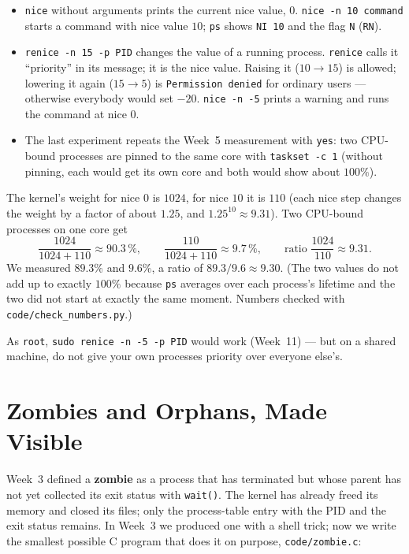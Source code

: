 \documentclass[11pt,a4paper]{article}
\newcommand{\term}[1]{\textbf{\color{mintdeep}#1}}
\newcommand{\cmd}[1]{\texttt{#1}}
\begin{document}
\begin{itemize}
  \item \cmd{nice} without arguments prints the current nice value, $0$. \cmd{nice -n 10 command} starts a command with nice value $10$; \cmd{ps} shows \texttt{NI 10} and the flag \texttt{N} (\texttt{RN}).
  \item \cmd{renice -n 15 -p PID} changes the value of a running process. \cmd{renice} calls it ``priority'' in its message; it is the nice value. Raising it ($10 \to 15$) is allowed; lowering it again ($15 \to 5$) is \texttt{Permission denied} for ordinary users --- otherwise everybody would set $-20$. \cmd{nice -n -5} prints a warning and runs the command at nice $0$.
  \item The last experiment repeats the Week~5 measurement with \cmd{yes}: two CPU-bound processes are pinned to the same core with \cmd{taskset -c 1} (without pinning, each would get its own core and both would show about $100\%$).
\end{itemize}

\begin{example}
The kernel's weight for nice $0$ is $1024$, for nice $10$ it is $110$ (each nice step changes the weight by a factor of about $1.25$, and $1.25^{10} \approx 9.31$). Two CPU-bound processes on one core get
\[
\frac{1024}{1024 + 110} \approx 90.3\,\%, \qquad \frac{110}{1024 + 110} \approx 9.7\,\%, \qquad \text{ratio } \frac{1024}{110} \approx 9.31 .
\]
We measured $89.3\%$ and $9.6\%$, a ratio of $89.3 / 9.6 \approx 9.30$. (The two values do not add up to exactly $100\%$ because \cmd{ps} averages over each process's lifetime and the two did not start at exactly the same moment. Numbers checked with \texttt{code/check\_numbers.py}.)
\end{example}

As \texttt{root}, \cmd{sudo renice -n -5 -p PID} would work (Week~11) --- but on a shared machine, do not give your own processes priority over everyone else's.

\section{Zombies and Orphans, Made Visible}
\label{sec:zombie}

Week~3 defined a \term{zombie} as a process that has terminated but whose parent has not yet collected its exit status with \cmd{wait()}. The kernel has already freed its memory and closed its files; only the process-table entry with the PID and the exit status remains. In Week~3 we produced one with a shell trick; now we write the smallest possible C program that does it on purpose, \texttt{code/zombie.c}:
\end{document}

